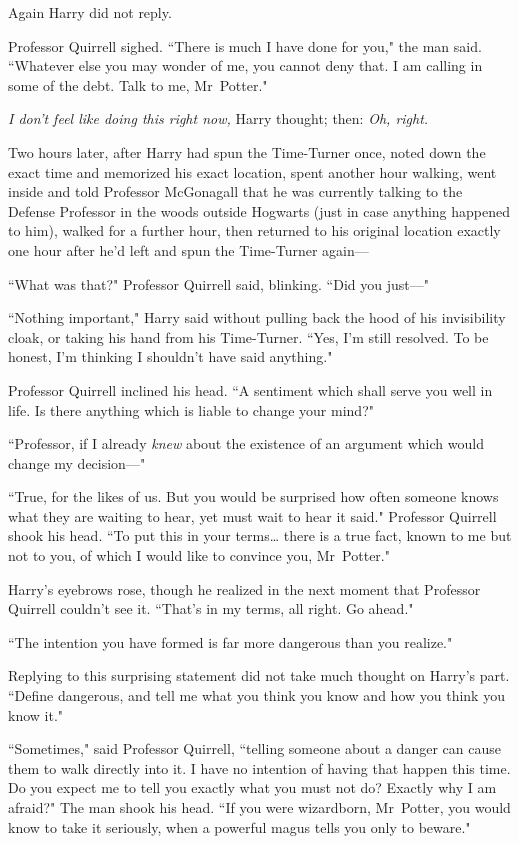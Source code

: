 Again Harry did not reply.

Professor Quirrell sighed. ``There is much I have done for you," the man said. ``Whatever else you may wonder of me, you cannot deny that. I am calling in some of the debt. Talk to me, Mr~Potter."

\emph{I don't feel like doing this right now,} Harry thought; then: \emph{Oh, right.}

\later

Two hours later, after Harry had spun the Time-Turner once, noted down the exact time and memorized his exact location, spent another hour walking, went inside and told Professor McGonagall that he was currently talking to the Defense Professor in the woods outside Hogwarts (just in case anything happened to him), walked for a further hour, then returned to his original location exactly one hour after he'd left and spun the Time-Turner again—

\later

``What was that?" Professor Quirrell said, blinking. ``Did you just—"

``Nothing important," Harry said without pulling back the hood of his invisibility cloak, or taking his hand from his Time-Turner. ``Yes, I'm still resolved. To be honest, I'm thinking I shouldn't have said anything."

Professor Quirrell inclined his head. ``A sentiment which shall serve you well in life. Is there anything which is liable to change your mind?"

``Professor, if I already \emph{knew} about the existence of an argument which would change my decision—"

``True, for the likes of us. But you would be surprised how often someone knows what they are waiting to hear, yet must wait to hear it said." Professor Quirrell shook his head. ``To put this in your terms{\ldots} there is a true fact, known to me but not to you, of which I would like to convince you, Mr~Potter."

Harry's eyebrows rose, though he realized in the next moment that Professor Quirrell couldn't see it. ``That's in my terms, all right. Go ahead."

``The intention you have formed is far more dangerous than you realize."

Replying to this surprising statement did not take much thought on Harry's part. ``Define dangerous, and tell me what you think you know and how you think you know it."

``Sometimes," said Professor Quirrell, ``telling someone about a danger can cause them to walk directly into it. I have no intention of having that happen this time. Do you expect me to tell you exactly what you must not do? Exactly why I am afraid?" The man shook his head. ``If you were wizardborn, Mr~Potter, you would know to take it seriously, when a powerful magus tells you only to beware."

